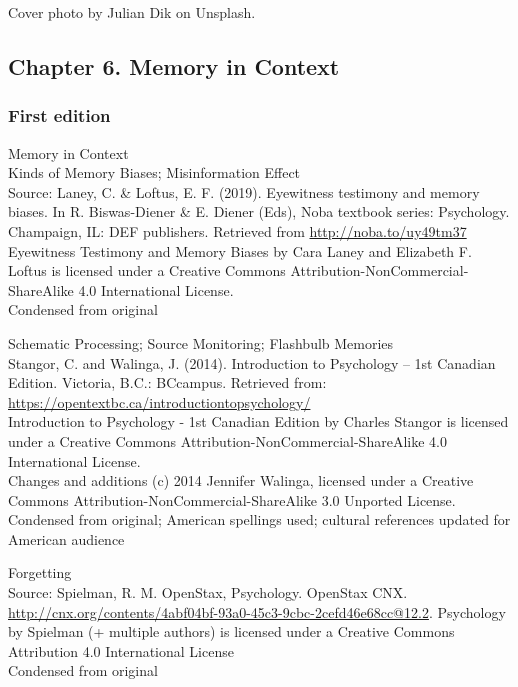 \documentclass[
]{krantz}
\begin{document}
Cover photo by Julian Dik on Unsplash.

\subsection*{Chapter 6. Memory in Context}\label{chapter-6.-memory-in-context}


\subsubsection*{First edition}\label{first-edition-6}


Memory in Context\\
Kinds of Memory Biases; Misinformation Effect\\
Source: Laney, C. \& Loftus, E. F. (2019). Eyewitness testimony and memory biases. In R. Biswas-Diener \& E. Diener (Eds), Noba textbook series: Psychology. Champaign, IL: DEF publishers. Retrieved from \url{http://noba.to/uy49tm37}\\
Eyewitness Testimony and Memory Biases by Cara Laney and Elizabeth F. Loftus is licensed under a Creative Commons Attribution-NonCommercial-ShareAlike 4.0 International License.\\
Condensed from original

Schematic Processing; Source Monitoring; Flashbulb Memories\\
Stangor, C. and Walinga, J. (2014). Introduction to Psychology -- 1st Canadian Edition. Victoria, B.C.: BCcampus. Retrieved from: \url{https://opentextbc.ca/introductiontopsychology/}\\
Introduction to Psychology - 1st Canadian Edition by Charles Stangor is licensed under a Creative Commons Attribution-NonCommercial-ShareAlike 4.0 International License.\\
Changes and additions (c) 2014 Jennifer Walinga, licensed under a Creative Commons Attribution-NonCommercial-ShareAlike 3.0 Unported License.\\
Condensed from original; American spellings used; cultural references updated for American audience

Forgetting\\
Source: Spielman, R. M. OpenStax, Psychology. OpenStax CNX. \url{http://cnx.org/contents/4abf04bf-93a0-45c3-9cbc-2cefd46e68cc@12.2}.
Psychology by Spielman (+ multiple authors) is licensed under a Creative Commons Attribution 4.0 International License\\
Condensed from original
\end{document}
